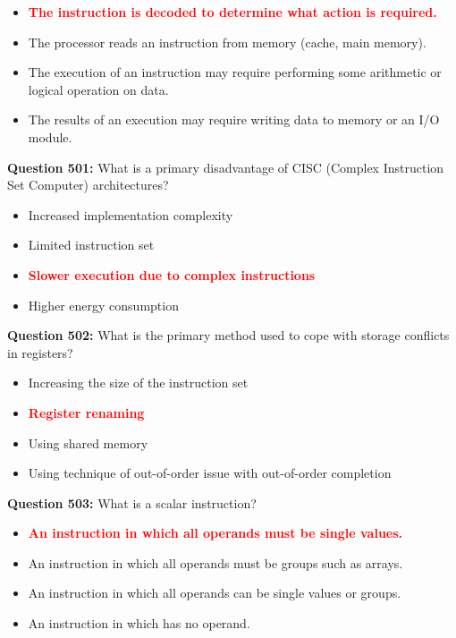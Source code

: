 \documentclass[12pt,a4paper]{article}
\begin{document}
\begin{itemize}
    \item[\textbf{A.}] \textcolor{red}{\textbf{The instruction is decoded to determine what action is required.}}
    \item[\textbf{B.}] The processor reads an instruction from memory (cache, main memory).
    \item[\textbf{C.}] The execution of an instruction may require performing some arithmetic or logical operation on data.
    \item[\textbf{D.}] The results of an execution may require writing data to memory or an I/O module.
\end{itemize}

\vspace{0.5cm}

\textbf{Question 501:} What is a primary disadvantage of CISC (Complex Instruction Set Computer) architectures?

\begin{itemize}
    \item[\textbf{A.}] Increased implementation complexity
    \item[\textbf{B.}] Limited instruction set
    \item[\textbf{C.}] \textcolor{red}{\textbf{Slower execution due to complex instructions}}
    \item[\textbf{D.}] Higher energy consumption
\end{itemize}

\vspace{0.5cm}

\textbf{Question 502:} What is the primary method used to cope with storage conflicts in registers?

\begin{itemize}
    \item[\textbf{A.}] Increasing the size of the instruction set
    \item[\textbf{B.}] \textcolor{red}{\textbf{Register renaming}}
    \item[\textbf{C.}] Using shared memory
    \item[\textbf{D.}] Using technique of out-of-order issue with out-of-order completion
\end{itemize}

\vspace{0.5cm}

\textbf{Question 503:} What is a scalar instruction?

\begin{itemize}
    \item[\textbf{A.}] \textcolor{red}{\textbf{An instruction in which all operands must be single values.}}
    \item[\textbf{B.}] An instruction in which all operands must be groups such as arrays.
    \item[\textbf{C.}] An instruction in which all operands can be single values or groups.
    \item[\textbf{D.}] An instruction in which has no operand.
\end{itemize}
\end{document}
